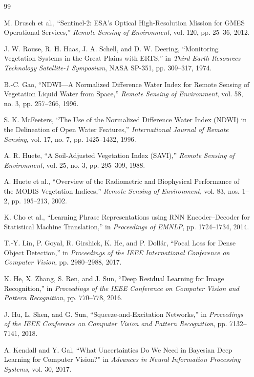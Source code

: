 \documentclass[11pt,a4paper]{article}
\begin{document}
\begin{thebibliography}{99}

M. Drusch et al.,
``Sentinel-2: ESA's Optical High-Resolution Mission for GMES
Operational Services,''
\emph{Remote Sensing of Environment},
vol. 120, pp. 25--36, 2012.

J. W. Rouse, R. H. Haas, J. A. Schell, and D. W. Deering,
``Monitoring Vegetation Systems in the Great Plains with ERTS,''
in \emph{Third Earth Resources Technology Satellite-1 Symposium},
NASA SP-351, pp. 309--317, 1974.

B.-C. Gao,
``NDWI---A Normalized Difference Water Index for Remote Sensing of
Vegetation Liquid Water from Space,''
\emph{Remote Sensing of Environment},
vol. 58, no. 3, pp. 257--266, 1996.

S. K. McFeeters,
``The Use of the Normalized Difference Water Index (NDWI) in the
Delineation of Open Water Features,''
\emph{International Journal of Remote Sensing},
vol. 17, no. 7, pp. 1425--1432, 1996.

A. R. Huete,
``A Soil-Adjusted Vegetation Index (SAVI),''
\emph{Remote Sensing of Environment},
vol. 25, no. 3, pp. 295--309, 1988.

A. Huete et al.,
``Overview of the Radiometric and Biophysical Performance of the
MODIS Vegetation Indices,''
\emph{Remote Sensing of Environment},
vol. 83, nos. 1--2, pp. 195--213, 2002.

K. Cho et al.,
``Learning Phrase Representations using RNN Encoder--Decoder for
Statistical Machine Translation,''
in \emph{Proceedings of EMNLP}, pp. 1724--1734, 2014.

T.-Y. Lin, P. Goyal, R. Girshick, K. He, and P. Doll\'ar,
``Focal Loss for Dense Object Detection,''
in \emph{Proceedings of the IEEE International Conference on
Computer Vision}, pp. 2980--2988, 2017.

K. He, X. Zhang, S. Ren, and J. Sun,
``Deep Residual Learning for Image Recognition,''
in \emph{Proceedings of the IEEE Conference on Computer Vision and
Pattern Recognition}, pp. 770--778, 2016.

J. Hu, L. Shen, and G. Sun,
``Squeeze-and-Excitation Networks,''
in \emph{Proceedings of the IEEE Conference on Computer Vision and
Pattern Recognition}, pp. 7132--7141, 2018.

A. Kendall and Y. Gal,
``What Uncertainties Do We Need in Bayesian Deep Learning for
Computer Vision?''
in \emph{Advances in Neural Information Processing Systems},
vol. 30, 2017.


\end{thebibliography}
\end{document}
